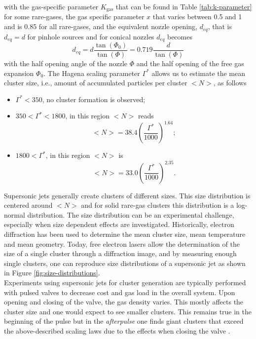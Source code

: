 with the gas-specific parameter $K_{\text{gas}}$ that can be found in Table \ref{tab:k-parameter} for some rare-gases, the gas specific parameter $x$ that varies between 0.5 and 1 and is 0.85 for all rare-gases, and the equivalent nozzle opening, $d_{eq}$, that is $d_{eq}=d$ for pinhole sources and for conical nozzles $d_{eq}$ becomes \citep{Schorb-2012-Thesis}
\begin{equation}
d_{eq} = d\frac{\tan\left(\Phi_{0}\right)}{\tan\left(\Phi\right)} = 0.719 \frac{d}{\tan\left(\Phi\right)}
\label{eq:equivalent-nozzle-opening}
\end{equation}
with the half opening angle of the nozzle $\Phi$ and the half opening of the free gas expansion $\Phi_{0}$. The Hagena scaling parameter $\Gamma^{*}$ allows us to estimate the mean cluster size, i.e., amount of accumulated particles per cluster $<N>$, as follows
\begin{itemize}
	\item $\Gamma^{*} < 350$, no cluster formation is observed;
	\item $350 < \Gamma^{*} < 1800$, in this region $<N>$ reads
		\begin{equation}
		<N> = 38.4 \left(\frac{\Gamma^{*}}{1000}\right)^{1.64};
		\label{eq:intermediate-hagena-scaling}
		\end{equation}
	\item $1800 < \Gamma^{*}$, in this region $<N>$ is
		\begin{equation}
		<N> = 33.0 \left(\frac{\Gamma^{*}}{1000}\right)^{2.35}.
		\label{eq:large-hagena-scaling}
		\end{equation}
\end{itemize}
Supersonic jets generally create clusters of different sizes. This size distribution is centered around $<N>$ and for solid rare-gas clusters this distribution is a log-normal distribution. The size distribution can be an experimental challenge, especially when size dependent effects are investigated. Historically, electron diffraction \cite{Farges-1981-SurfSci,Bartell-1986-ChemRev} has been used to determine the mean cluster size, mean temperature and mean geometry. Today, free electron lasers allow the determination of the size of a single cluster through a diffraction image, and by measuring enough single clusters, one can reproduce size distributions of a supersonic jet as shown in Figure \ref{fig:size-distributions}.\\[1\baselineskip]
Experiments using supersonic jets for cluster generation are typically performed with pulsed valves to decrease cost and gas load in the overall system. Upon opening and closing of the valve, the gas density varies. This mostly affects the cluster size and one would expect to see smaller clusters. This remains true in the beginning of the pulse but in the \textit{afterpulse} one finds giant clusters that exceed the above-described scaling laws due to the effects when closing the valve \cite{Rupp-2014-JCP}.
%
%
%
%
%
